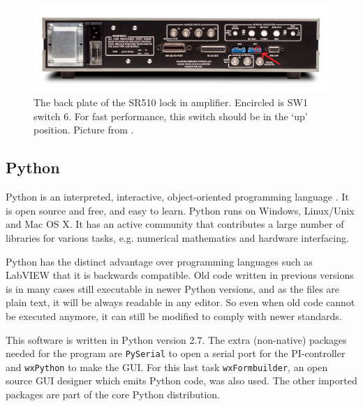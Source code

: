 \begin{figure}
 \begin{center}
  \includegraphics[width=\textwidth]{figures/SR510_Rear_circle.jpg}
  \caption{The back plate of the SR510 lock in amplifier. Encircled is SW1 switch 6. For fast performance, this switch should be in the `up' position. Picture from \cite{SR}.}
  \label{fig:SR510_back}
 \end{center}
\end{figure}


\subsection{Python}
Python is an interpreted, interactive, object-oriented programming language \cite{python}. It is open source and free, and easy to learn. Python runs on Windows, Linux/Unix and Mac OS X. It has an active community that contributes a large number of libraries for various tasks, e.g. numerical mathematics and hardware interfacing.

Python has the distinct advantage over programming languages such as LabVIEW that it is backwards compatible. Old code written in previous versions is in many cases still executable in newer Python versions, and as the files are plain text, it will be always readable in any editor. So even when old code cannot be executed anymore, it can still be modified to comply with newer standards.

This software is written in Python version 2.7. The extra (non-native) packages needed for the program are \verb!PySerial! to open a serial port for the PI-controller and \verb!wxPython! to make the GUI. For this last task \verb!wxFormbuilder!, an open source GUI designer which emits Python code, was also used. The other imported packages are part of the core Python distribution.
